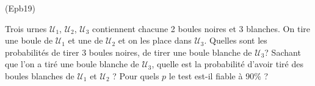 \begin{tiny}(Epb19)\end{tiny} Trois urnes $\mathcal{U}_1$, $\mathcal{U}_2$, $\mathcal{U}_3$ contiennent chacune 2 boules noires et 3 blanches. On tire une boule de $\mathcal{U}_1$ et une de $\mathcal{U}_2$ et on les place dans $\mathcal{U}_3$. Quelles sont les probabilités de tirer 3 boules noires, de tirer une boule blanche de $\mathcal{U}_3$?\newline
Sachant que l'on a tiré une boule blanche de $\mathcal{U}_3$, quelle est la probabilité d'avoir tiré des boules blanches de $\mathcal{U}_1$ et $\mathcal{U}_2$ ? Pour quels $p$ le test est-il fiable à 90\% ?

